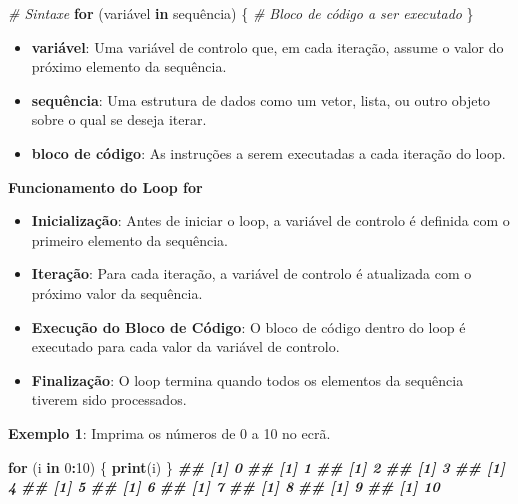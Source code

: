 \documentclass[
]{book}
\newenvironment{Shaded}{\begin{snugshade}}{\end{snugshade}}
\newcommand{\CommentTok}[1]{\textcolor[rgb]{0.56,0.35,0.01}{\textit{#1}}}
\newcommand{\ControlFlowTok}[1]{\textcolor[rgb]{0.13,0.29,0.53}{\textbf{#1}}}
\newcommand{\DecValTok}[1]{\textcolor[rgb]{0.00,0.00,0.81}{#1}}
\newcommand{\DocumentationTok}[1]{\textcolor[rgb]{0.56,0.35,0.01}{\textbf{\textit{#1}}}}
\newcommand{\FunctionTok}[1]{\textcolor[rgb]{0.13,0.29,0.53}{\textbf{#1}}}
\newcommand{\NormalTok}[1]{#1}
\newcommand{\SpecialCharTok}[1]{\textcolor[rgb]{0.81,0.36,0.00}{\textbf{#1}}}
\begin{document}
\begin{Shaded}
\begin{Highlighting}[]
\CommentTok{\# Sintaxe}
\ControlFlowTok{for}\NormalTok{ (variável }\ControlFlowTok{in}\NormalTok{ sequência) \{}
  \CommentTok{\# Bloco de código a ser executado}
\NormalTok{\}}
\end{Highlighting}
\end{Shaded}

\begin{itemize}
\item
  \textbf{variável}: Uma variável de controlo que, em cada iteração, assume
  o valor do próximo elemento da sequência.
\item
  \textbf{sequência}: Uma estrutura de dados como um vetor, lista, ou outro
  objeto sobre o qual se deseja iterar.
\item
  \textbf{bloco de código}: As instruções a serem executadas a cada
  iteração do loop.
\end{itemize}

\textbf{Funcionamento do Loop for}

\begin{itemize}
\item
  \textbf{Inicialização}: Antes de iniciar o loop, a variável de controlo é
  definida com o primeiro elemento da sequência.
\item
  \textbf{Iteração}: Para cada iteração, a variável de controlo é
  atualizada com o próximo valor da sequência.
\item
  \textbf{Execução do Bloco de Código}: O bloco de código dentro do loop é
  executado para cada valor da variável de controlo.
\item
  \textbf{Finalização}: O loop termina quando todos os elementos da
  sequência tiverem sido processados.
\end{itemize}

\textbf{Exemplo 1}: Imprima os números de 0 a 10 no ecrã.

\begin{Shaded}
\begin{Highlighting}[]
\ControlFlowTok{for}\NormalTok{ (i }\ControlFlowTok{in} \DecValTok{0}\SpecialCharTok{:}\DecValTok{10}\NormalTok{) \{}
  \FunctionTok{print}\NormalTok{(i)}
\NormalTok{\}}
\DocumentationTok{\#\# [1] 0}
\DocumentationTok{\#\# [1] 1}
\DocumentationTok{\#\# [1] 2}
\DocumentationTok{\#\# [1] 3}
\DocumentationTok{\#\# [1] 4}
\DocumentationTok{\#\# [1] 5}
\DocumentationTok{\#\# [1] 6}
\DocumentationTok{\#\# [1] 7}
\DocumentationTok{\#\# [1] 8}
\DocumentationTok{\#\# [1] 9}
\DocumentationTok{\#\# [1] 10}
\end{Highlighting}
\end{Shaded}
\end{document}
